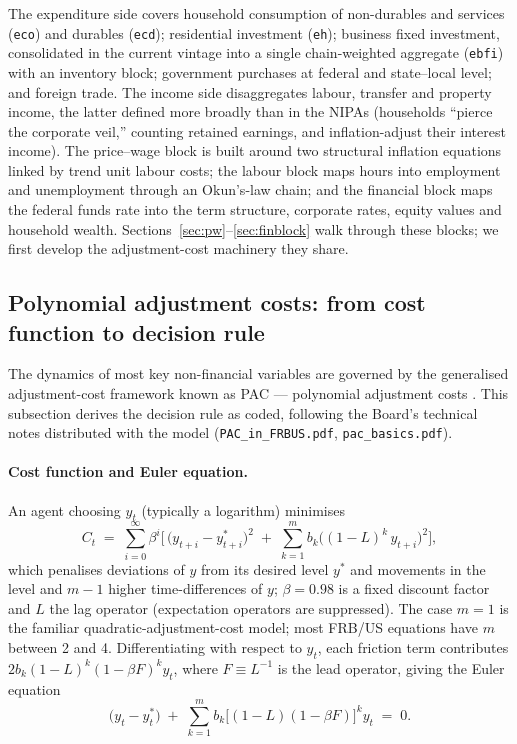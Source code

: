 The expenditure side covers household consumption of non-durables and services (\texttt{eco}) and durables (\texttt{ecd}); residential investment (\texttt{eh}); business fixed investment, consolidated in the current vintage into a single chain-weighted aggregate (\texttt{ebfi}) with an inventory block; government purchases at federal and state--local level; and foreign trade. The income side disaggregates labour, transfer and property income, the latter defined more broadly than in the NIPAs (households ``pierce the corporate veil,'' counting retained earnings, and inflation-adjust their interest income). The price--wage block is built around two structural inflation equations linked by trend unit labour costs; the labour block maps hours into employment and unemployment through an Okun's-law chain; and the financial block maps the federal funds rate into the term structure, corporate rates, equity values and household wealth. Sections~\ref{sec:pw}--\ref{sec:finblock} walk through these blocks; we first develop the adjustment-cost machinery they share.

\subsection{Polynomial adjustment costs: from cost function to decision rule}
\label{sec:pac}

The dynamics of most key non-financial variables are governed by the generalised adjustment-cost framework known as PAC --- polynomial adjustment costs \citep{tinsley1993, tinsley2002}. This subsection derives the decision rule as coded, following the Board's technical notes distributed with the model (\texttt{PAC\_in\_FRBUS.pdf}, \texttt{pac\_basics.pdf}).

\paragraph{Cost function and Euler equation.} An agent choosing $y_t$ (typically a logarithm) minimises
\begin{equation}
C_t \;=\; \sum_{i=0}^{\infty} \beta^{i}\Big[\,\big(y_{t+i}-y^{*}_{t+i}\big)^{2} \;+\; \sum_{k=1}^{m} b_k\big((1-L)^{k}\,y_{t+i}\big)^{2}\Big],
\label{eq:pac-cost}
\end{equation}
which penalises deviations of $y$ from its desired level $y^{*}$ and movements in the level and $m-1$ higher time-differences of $y$; $\beta=0.98$ is a fixed discount factor and $L$ the lag operator (expectation operators are suppressed). The case $m=1$ is the familiar quadratic-adjustment-cost model; most FRB/US equations have $m$ between 2 and 4. Differentiating with respect to $y_t$, each friction term contributes $2b_k(1-L)^k(1-\beta F)^k y_t$, where $F\equiv L^{-1}$ is the lead operator, giving the Euler equation
\begin{equation}
\big(y_t - y^{*}_t\big) \;+\; \sum_{k=1}^{m} b_k\big[(1-L)(1-\beta F)\big]^{k} y_t \;=\; 0.
\label{eq:pac-euler}
\end{equation}

